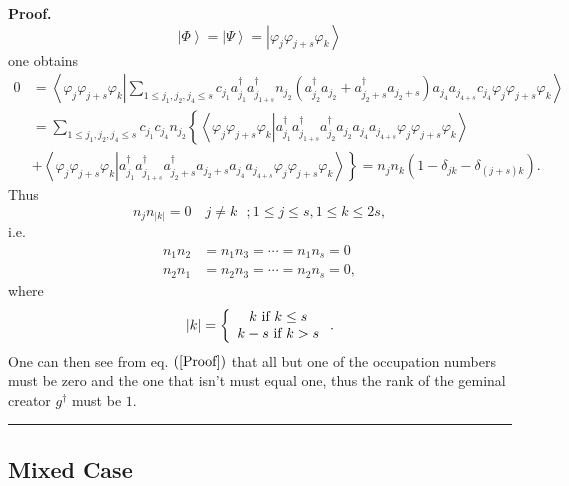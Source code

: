 \documentclass[aps,preprint,amsfonts,amssymb,showpacs,showkeys]{revtex4}%
\newenvironment{proof}[1][Proof]{\noindent\textbf{#1.} }{\ \rule{0.5em}{0.5em}}
\begin{document}
\begin{proof}
\begin{equation}
\left\vert \Phi\right\rangle =\left\vert \Psi\right\rangle =\left\vert
\varphi_{j}\varphi_{j+s}\varphi_{k}\right\rangle
\end{equation}
one obtains
\begin{align}
0  &  =\left\langle \varphi_{j}\varphi_{j+s}\varphi_{k}\left\vert \sum_{1\leq
j_{1},j_{2},j_{4}\leq s}c_{j_{1}}a_{j_{1}}^{\dagger}a_{j_{1+s}}^{\dagger
}n_{j_{2}}\left(  a_{j_{2}}^{\dagger}a_{j_{2}}+a_{j_{2}+s}^{\dagger}%
a_{j_{2}+s}\right)  a_{j_{4}}a_{j_{4+s}}c_{j_{4}}\varphi_{j}\varphi
_{j+s}\varphi_{k}\right.  \right\rangle \nonumber\\
&  =\sum_{1\leq j_{1},j_{2},j_{4}\leq s}c_{j_{1}}c_{j_{4}}n_{j_{2}}\left\{
\left\langle \varphi_{j}\varphi_{j+s}\varphi_{k}\left\vert a_{j_{1}}^{\dagger
}a_{j_{1+s}}^{\dagger}a_{j_{2}}^{\dagger}a_{j_{2}}a_{j_{4}}a_{j_{4+s}}%
\varphi_{j}\varphi_{j+s}\varphi_{k}\right.  \right\rangle \right. \nonumber\\
&  \left.  +\right.  \left.  \left\langle \varphi_{j}\varphi_{j+s}\varphi
_{k}\left\vert a_{j_{1}}^{\dagger}a_{j_{1+s}}^{\dagger}a_{j_{2}+s}^{\dagger
}a_{j_{2}+s}a_{j_{4}}a_{j_{4+s}}\varphi_{j}\varphi_{j+s}\varphi_{k}\right.
\right\rangle \right\}  =n_{j}n_{k}\left(  1-\delta_{jk}-\delta_{\left(
j+s\right)  k}\right)  .
\end{align}
Thus
\begin{equation}
n_{j}n_{\left\vert k\right\vert }=0\quad j\neq k\text{ };1\leq j\leq s,1\leq
k\leq2s,
\end{equation}
i.e.
\begin{align}
n_{1}n_{2}  &  =n_{1}n_{3}=\cdots=n_{1}n_{s}=0\nonumber\\
n_{2}n_{1}  &  =n_{2}n_{3}=\cdots=n_{2}n_{s}=0, \label{Proof}%
\end{align}
where
\begin{equation}
\left\vert k\right\vert =\left\{
\begin{array}
[c]{c}%
k\text{ if }k\leq s\\
k-s\text{ if }k>s
\end{array}
\right.  .
\end{equation}
One can then see from eq. $\left(  \ref{Proof}\right)  $ that all but one of
the occupation numbers must be zero and the one that isn't must equal one,
thus the rank of the geminal creator $g^{\dagger}$ must be $1.$
\end{proof}

\subsection{Mixed Case}
\end{document}

